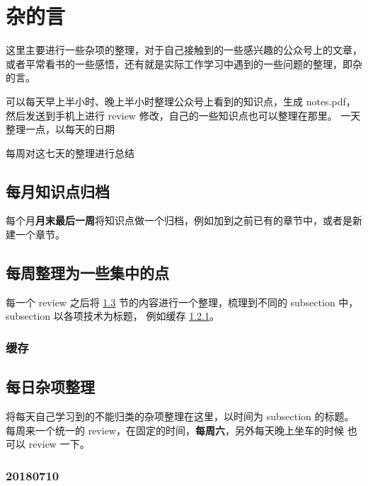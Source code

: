 \chapter{杂的言}\label{chap:misc}

\begin{intro}
这里主要进行一些杂项的整理，对于自己接触到的一些感兴趣的公众号上的文章，或者平常看书的一些感悟，还有就是实际工作学习中遇到的一些问题的整理，即杂的言。

可以每天早上半小时、晚上半小时整理公众号上看到的知识点，生成 notes.pdf，然后发送到手机上进行 review 修改，自己的一些知识点也可以整理在那里。
一天整理一点，以每天的日期

每周对这七天的整理进行总结

\end{intro}

\section{每月知识点归档}\label{sec:everymonth-notes}

每个月\textbf{月末最后一周}将知识点做一个归档，例如加到之前已有的章节中，或者是新建一个章节。

\section{每周整理为一些集中的点}\label{sec:everyweek-notes}

每一个 review 之后将 \ref{sec:everyday-notes} 节的内容进行一个整理，梳理到不同的 subsection 中， subsection 以各项技术为标题，
例如缓存 \ref{subsec:cache}。

\subsection{缓存}\label{subsec:cache}


\section{每日杂项整理}\label{sec:everyday-notes}

将每天自己学习到的不能归类的杂项整理在这里，以时间为 subsection 的标题。每周来一个统一的 review，在固定的时间，\textbf{每周六}，另外每天晚上坐车的时候
也可以 review 一下。

\subsection{20180710}\label{subsec:date-20180710}

